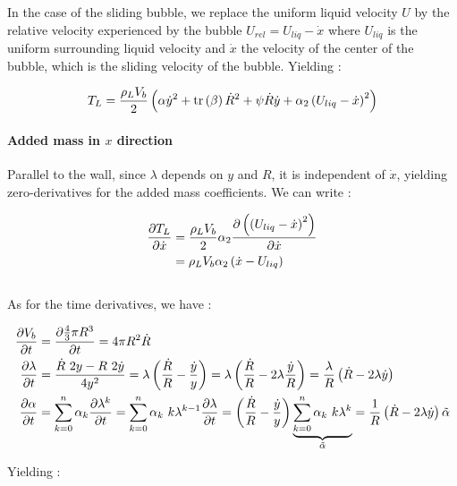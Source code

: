 In the case of the sliding bubble, we replace the uniform liquid velocity $U$ by the relative velocity experienced by the bubble $U_{rel}=U_{liq}-\dot{x}$ where $U_{liq}$ is the uniform surrounding liquid velocity and $\dot{x}$ the velocity of the center of the bubble, which is the sliding velocity of the bubble. Yielding :



\begin{align}
T_{L}=\frac{\rho_{L}V_{b}}{2}\left( \alpha \dot{y}^{2} +\mathrm{tr}\left( \beta \right)\dot{R}^{2}+\psi \dot{R}\dot{y} +\alpha_{2} \left( U_{liq}-\dot{x} \right)^{2}  \right)
\end{align}
 

\paragraph{Added mass in $x$ direction}

Parallel to the wall, since $\lambda$ depends on $y$ and $R$, it is independent of $\dot{x}$, yielding zero-derivatives for the added mass coefficients. We can write :

\begin{align}
\frac{\partial T_{L}}{\partial \dot{x}}&=\frac{\rho_{L}V_{b}}{2}\alpha_{2} \frac{\partial \left(  \left( U_{liq}-\dot{x} \right)^{2} \right) }{\partial \dot{x}}\\
&= \rho_{L}V_{b}\alpha_{2}\left( \dot{x}-U_{liq} \right)\\
\end{align}\\

As for the time derivatives, we have : 

\begin{align}
\frac{\partial V_{b}}{\partial t}&=\frac{\partial \frac{4}{3}\pi R^{3}}{\partial t} = 4\pi R^{2} \dot{R}\\
\frac{\partial \lambda}{\partial t}&=\frac{\dot{R}~2y-R~2\dot{y}}{4y^{2}}=\lambda\left(  \frac{\dot{R}}{R} - \frac{\dot{y}}{y}   \right)=\lambda \left( \frac{\dot{R}}{R}-2\lambda \frac{\dot{y}}{R} \right)=\frac{\lambda}{R}\left( \dot{R}-2\lambda \dot{y} \right)\\
\frac{\partial \alpha}{\partial t}&=\sum_{k=0}^{n}\alpha_{k}\frac{\partial \lambda ^{k}}{\partial t} = \sum_{k=0}^{n}\alpha_{k}~k\lambda ^{k-1} \frac{\partial \lambda}{\partial t} = \left(  \frac{\dot{R}}{R} - \frac{\dot{y}}{y}   \right)\underbrace{ \sum_{k=0}^{n}\alpha_{k}~k\lambda^{k} }_{\tilde{\alpha}} = \frac{1}{R}\left( \dot{R}-2\lambda \dot{y} \right)\tilde{\alpha}
\end{align}

Yielding : 

